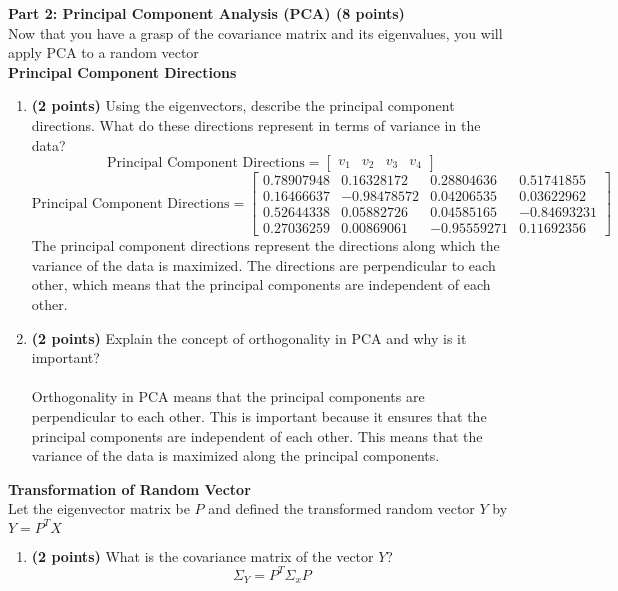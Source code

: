 \documentclass[a3paper,12pt]{extarticle} %
\begin{document}
\begin{enumerate}
\begin{enumerate}
    \end{enumerate} 
    \subitem \textbf{Part 2: Principal Component Analysis (PCA) (8 points)}
    \\ Now that you have a grasp of the covariance matrix and its eigenvalues, you will apply PCA to a random vector
    \\ \subitem \textbf{Principal Component Directions}
    \begin{enumerate}
    \item \textbf{(2 points)} Using the eigenvectors, describe the principal component directions. What do these directions represent in terms of variance in the data?
    \[
    \text{Principal Component Directions} = \begin{bmatrix}v_1 & v_2 & v_3 & v_4\end{bmatrix}
    \]
    \[
    \text{Principal Component Directions} = \begin{bmatrix}0.78907948 & 0.16328172 & 0.28804636 & 0.51741855\\0.16466637 & -0.98478572 & 0.04206535 &  0.03622962\\0.52644338 & 0.05882726 & 0.04585165 & -0.84693231\\0.27036259 & 0.00869061 & -0.95559271 & 0.11692356\end{bmatrix}
    \]
    The principal component directions represent the directions along which the variance of the data is maximized. The directions are perpendicular to each other, which means that the principal components are independent of each other.
    \item \textbf{(2 points)} Explain the concept of orthogonality in PCA and why is it important?
    \\\\ Orthogonality in PCA means that the principal components are perpendicular to each other. This is important because it ensures that the principal components are independent of each other. This means that the variance of the data is maximized along the principal components.
    \end{enumerate}
    \subitem \textbf{Transformation of Random Vector}
    \\ Let the eigenvector matrix be \(P\) and defined the transformed random vector \(Y\) by \(Y = P^TX\)
    \begin{enumerate}
    \item \textbf{(2 points)} What is the covariance matrix of the  vector \(Y\)?
    \[
    \Sigma_Y = P^T\Sigma_xP
    \]
    \[
\]
\end{enumerate}
\end{enumerate}
\end{document}
